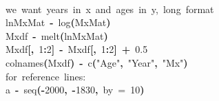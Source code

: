 \documentclass[a4paper]{article}
\newcommand{\hlnumber}[1]{\textcolor[rgb]{0.0823529411764706,0.0784313725490196,0.709803921568627}{#1}}%
\newcommand{\hlfunctioncall}[1]{\textcolor[rgb]{1,0,0}{#1}}%
\newcommand{\hlstring}[1]{\textcolor[rgb]{0.6,0.6,1}{#1}}%
\newcommand{\hlkeyword}[1]{\textcolor[rgb]{0,0,0}{\textbf{#1}}}%
\newcommand{\hlargument}[1]{\textcolor[rgb]{0.694117647058824,0.247058823529412,0.0196078431372549}{#1}}%
\newcommand{\hlcomment}[1]{\textcolor[rgb]{0.8,0.8,0.8}{#1}}%
\newcommand{\hlassignement}[1]{\textcolor[rgb]{0.215686274509804,0.215686274509804,0.384313725490196}{\textbf{#1}}}%
\newcommand{\hlsymbol}[1]{\textcolor[rgb]{0,0,0}{#1}}%
\newcommand{\hlprompt}[1]{\textcolor[rgb]{0,0,0}{#1}}%
\newcommand{\hlstd}[1]{\textcolor[rgb]{0,0,0}{#1}}%
\newenvironment{Houtput}{\raggedright}{%
%
}
\begin{document}
\begin{Houtput}
\normalfont
\hspace*{\fill}\\
\hlstd{}\ttfamily\noindent
\hlprompt{\usebox{\hlnormalsizeboxgreaterthan}{\ }}\hlcomment{\usebox{\hlnormalsizeboxhash}{\ }we{\ }want{\ }years{\ }in{\ }x{\ }and{\ }ages{\ }in{\ }y,{\ }long{\ }format}\mbox{}
\normalfont
\hspace*{\fill}\\
\hlstd{}\ttfamily\noindent
\hlprompt{\usebox{\hlnormalsizeboxgreaterthan}{\ }}\hlsymbol{lnMxMat}{\ }\hlassignement{\usebox{\hlnormalsizeboxlessthan}-}{\ }\hlfunctioncall{log}\hlkeyword{(}\hlsymbol{MxMat}\hlkeyword{)}\mbox{}
\normalfont
\hspace*{\fill}\\
\hlstd{}\ttfamily\noindent
\hlprompt{\usebox{\hlnormalsizeboxgreaterthan}{\ }}\hlsymbol{Mxdf}{\ }\hlassignement{\usebox{\hlnormalsizeboxlessthan}-}{\ }\hlfunctioncall{melt}\hlkeyword{(}\hlsymbol{lnMxMat}\hlkeyword{)}\mbox{}
\normalfont
\hspace*{\fill}\\
\hlstd{}\ttfamily\noindent
\hlprompt{\usebox{\hlnormalsizeboxgreaterthan}{\ }}\hlsymbol{Mxdf}\hlkeyword{[}\hlkeyword{,}{\ }\hlnumber{1}\hlkeyword{:}\hlnumber{2}\hlkeyword{]}{\ }\hlassignement{\usebox{\hlnormalsizeboxlessthan}-}{\ }\hlsymbol{Mxdf}\hlkeyword{[}\hlkeyword{,}{\ }\hlnumber{1}\hlkeyword{:}\hlnumber{2}\hlkeyword{]}{\ }\hlkeyword{+}{\ }\hlnumber{0.5}\mbox{}
\normalfont
\hspace*{\fill}\\
\hlstd{}\ttfamily\noindent
\hlprompt{\usebox{\hlnormalsizeboxgreaterthan}{\ }}\hlfunctioncall{colnames}\hlkeyword{(}\hlsymbol{Mxdf}\hlkeyword{)}{\ }\hlassignement{\usebox{\hlnormalsizeboxlessthan}-}{\ }\hlfunctioncall{c}\hlkeyword{(}\hlstring{"Age"}\hlkeyword{,}{\ }\hlstring{"Year"}\hlkeyword{,}{\ }\hlstring{"Mx"}\hlkeyword{)}\mbox{}
\normalfont
\hspace*{\fill}\\
\hlstd{}\ttfamily\noindent
\hlprompt{\usebox{\hlnormalsizeboxgreaterthan}{\ }}\hlcomment{\usebox{\hlnormalsizeboxhash}{\ }for{\ }reference{\ }lines:}\mbox{}
\normalfont
\hspace*{\fill}\\
\hlstd{}\ttfamily\noindent
\hlprompt{\usebox{\hlnormalsizeboxgreaterthan}{\ }}\hlsymbol{a}{\ }\hlassignement{\usebox{\hlnormalsizeboxlessthan}-}{\ }\hlfunctioncall{seq}\hlkeyword{(}\hlkeyword{-}\hlnumber{2000}\hlkeyword{,}{\ }\hlkeyword{-}\hlnumber{1830}\hlkeyword{,}{\ }\hlargument{by}{\ }\hlargument{=}{\ }\hlnumber{10}\hlkeyword{)}\mbox{}

\end{Houtput}
\end{document}
